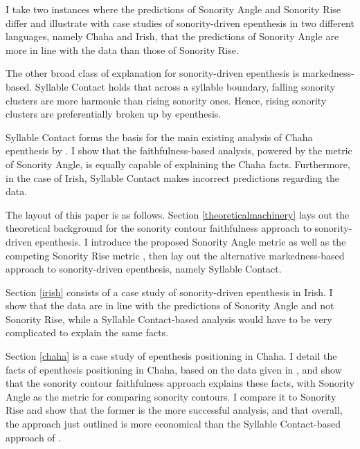 \documentclass[12pt]{article}
\begin{document}
I take two instances where the predictions of {\sc Sonority Angle} and {\sc Sonority Rise} differ and illustrate with case studies of sonority-driven epenthesis in two different languages, namely Chaha and Irish, that the predictions of {\sc Sonority Angle} are more in line with the data than those of {\sc Sonority Rise}.

\bigskip

The other broad class of explanation for sonority-driven epenthesis is markedness-based.  Syllable Contact \citep{murray.vennemann.1983} holds that across a syllable boundary, falling sonority clusters are more harmonic than rising sonority ones.  Hence, rising sonority clusters are preferentially broken up by epenthesis.

Syllable Contact forms the basis for the main existing analysis of Chaha epenthesis by \citet{rose.2000}.  I show that the faithfulness-based analysis, powered by the metric of {\sc Sonority Angle}, is equally capable of explaining the Chaha facts. Furthermore, in the case of Irish, Syllable Contact makes incorrect predictions regarding the data.

\bigskip

The layout of this paper is as follows.  Section \ref{theoreticalmachinery} lays out the theoretical background for the sonority contour faithfulness approach to 
sonority-driven epenthesis. I introduce the proposed {\sc Sonority Angle} metric as well as the competing {\sc Sonority Rise} metric \citep{flemming.2008}, 
then lay out the alternative markedness-based approach to sonority-driven epenthesis, namely Syllable Contact.

Section \ref{irish} consists of a case study of sonority-driven epenthesis in Irish.  I show that the data are in line with the predictions of {\sc Sonority Angle} and not {\sc Sonority Rise}, while a Syllable Contact-based analysis would have to be very complicated to explain the same facts.

Section \ref{chaha} is a case study of epenthesis positioning in Chaha.  I detail the facts of epenthesis positioning in Chaha, based on the data given in \citet{rose.2000},
and show that the sonority contour faithfulness approach explains these facts, with {\sc Sonority Angle} as the metric for comparing sonority contours.  I compare it to {\sc Sonority Rise} and show that the former is the more successful analysis, and that overall, the approach just outlined is more economical than the  Syllable Contact-based approach of \citet{rose.2000}.
\end{document}
